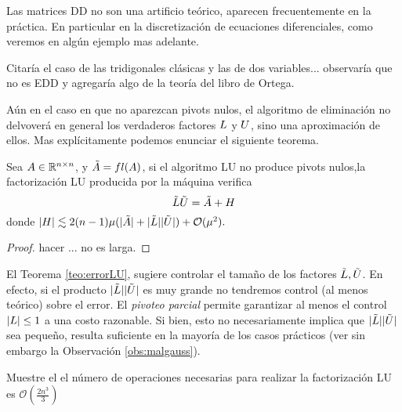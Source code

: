 \begin{tcolorbox}
\begin{rem}
 Las matrices DD no son una artificio teórico, aparecen frecuentemente en la práctica. En particular en la discretización de ecuaciones diferenciales, como veremos en algún ejemplo mas adelante.

 Citaría el caso de las tridigonales clásicas y las de dos variables...
 observaría que no es EDD y agregaría algo de la teoría del libro de Ortega.
\end{rem}
\etcc

Aún en el caso en que no aparezcan pivots nulos, el algoritmo de eliminación no delvoverá en general los verdaderos factores $\Lb$ y $\Ub$, sino una aproximación de ellos. Mas explícitamente podemos enunciar el siguiente teorema.
\begin{tcolorbox}
[colback=black!15!white,colframe=black!75!black]
\begin{teo}\label{teo:errorLU}
 Sea $\Ab\in \Rnn$, y $\tilde\Ab=fl(\Ab)$, si el algoritmo LU no produce pivots nulos,la factorización LU producida por la máquina verifica
 $$
 \tilde\Lb\tilde \Ub=\tilde \Ab + \Hb
 $$
donde $|\Hb|\lesssim 2(n-1)\mu(|\tilde \Ab|+|\tilde \Lb||\tilde \Ub|)
+\mathcal{O}(\mu^2).
$
\end{teo}

\end{tcolorbox}
\begin{proof}
 hacer ... no es larga.
\end{proof}


\begin{tcolorbox}
\begin{rem}
 El Teorema \ref{teo:errorLU}, sugiere controlar el tamaño de los factores
$\tilde\Lb,\tilde\Ub$. En efecto, si el producto
$|\tilde \Lb||\tilde \Ub|$ es muy grande no tendremos control (al menos teórico) sobre el error. El \emph{pivoteo parcial} permite garantizar al menos el control $|\Lb|\le 1$ a una costo razonable. Si bien, esto no necesariamente implica que $|\tilde \Lb||\tilde \Ub|$ sea pequeño, resulta suficiente en la mayoría de los casos prácticos (ver sin embargo la Observación \ref{obs:malgauss}).

\end{rem}

\end{tcolorbox}


\begin{ej}
 Muestre el el número de operaciones necesarias para realizar la factorización LU es $\mathcal{O} (\frac{2n^3}{3})$
\end{ej}


\end{tcolorbox}
